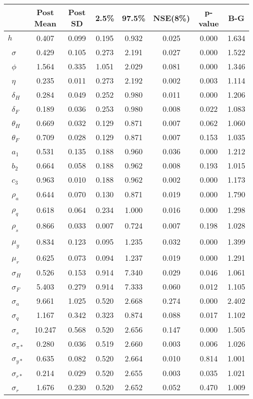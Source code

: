 \begin{tiny}\begin{tabular}{lccccccc}
\hline
&\textbf{Post Mean}&\textbf{Post SD}&\textbf{2.5\%}&\textbf{97.5\%}&\textbf{NSE(8\%)}&\textbf{p-value}&\textbf{B-G}\\\hline
\textbf{$ h             $}&0.407&0.099&0.195&0.932&0.025&0.000&1.634\\\
\textbf{$ \sigma        $}&0.429&0.105&0.273&2.191&0.027&0.000&1.522\\\
\textbf{$ \phi          $}&1.564&0.335&1.051&2.029&0.081&0.000&1.346\\\
\textbf{$ \eta          $}&0.235&0.011&0.273&2.192&0.002&0.003&1.114\\\
\textbf{$ \delta_{H}    $}&0.284&0.049&0.252&0.980&0.011&0.000&1.206\\\
\textbf{$ \delta_{F}    $}&0.189&0.036&0.253&0.980&0.008&0.022&1.083\\\
\textbf{$ \theta_{H}    $}&0.669&0.032&0.129&0.871&0.007&0.062&1.060\\\
\textbf{$ \theta_{F}    $}&0.709&0.028&0.129&0.871&0.007&0.153&1.035\\\
\textbf{$ a_{1}         $}&0.531&0.135&0.188&0.960&0.036&0.000&1.212\\\
\textbf{$ b_{2}         $}&0.664&0.058&0.188&0.962&0.008&0.193&1.015\\\
\textbf{$ c_{3}         $}&0.963&0.010&0.188&0.962&0.002&0.000&1.173\\\
\textbf{$ \rho_{a}      $}&0.644&0.070&0.130&0.871&0.019&0.000&1.790\\\
\textbf{$ \rho_{q}      $}&0.618&0.064&0.234&1.000&0.016&0.000&1.298\\\
\textbf{$ \rho_{s}      $}&0.866&0.033&0.007&0.724&0.007&0.198&1.028\\\
\textbf{$ \mu_{y}       $}&0.834&0.123&0.095&1.235&0.032&0.000&1.399\\\
\textbf{$ \mu_{r}       $}&0.625&0.073&0.094&1.237&0.019&0.000&1.291\\\
\textbf{$ \sigma_{H}    $}&0.526&0.153&0.914&7.340&0.029&0.046&1.061\\\
\textbf{$ \sigma_{F}    $}&5.403&0.279&0.914&7.333&0.060&0.012&1.105\\\
\textbf{$ \sigma_{a}    $}&9.661&1.025&0.520&2.668&0.274&0.000&2.402\\\
\textbf{$ \sigma_{q}    $}&1.167&0.342&0.323&0.874&0.088&0.017&1.102\\\
\textbf{$ \sigma_{s}    $}&10.247&0.568&0.520&2.656&0.147&0.000&1.505\\\
\textbf{$ \sigma_{\pi*} $}&0.280&0.036&0.519&2.660&0.003&0.006&1.026\\\
\textbf{$ \sigma_{y*}   $}&0.635&0.082&0.520&2.664&0.010&0.814&1.001\\\
\textbf{$ \sigma_{r*}   $}&0.214&0.029&0.520&2.655&0.003&0.035&1.021\\\
\textbf{$ \sigma_{r}    $}&1.676&0.230&0.520&2.652&0.052&0.470&1.009\\\hline
\end{tabular}
\end{tiny}